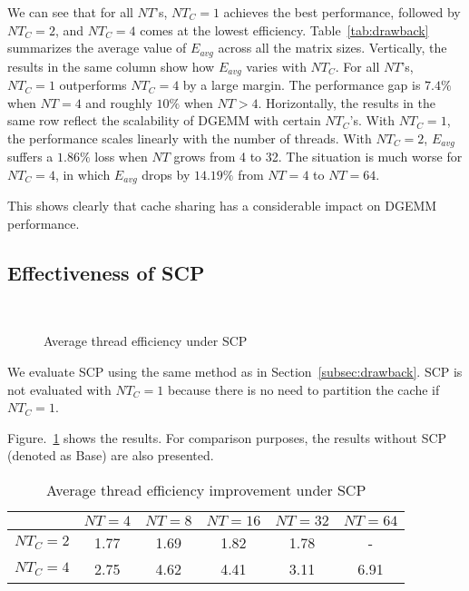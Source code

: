 We can see that for all $NT$'s, $NT_C=1$ achieves the 
best performance, followed by 
$NT_C=2$, and $NT_C=4$ comes at the lowest efficiency.
Table~\ref{tab:drawback} summarizes the average value
of $E_{avg}$ across all the matrix sizes.
Vertically, the results in the same column show how $E_{avg}$ varies with $NT_C$.
For all $NT$'s, $NT_C=1$ outperforms $NT_C=4$ by a large margin.
The performance gap is $7.4\%$ when $NT=4$ and roughly $10\%$ when $NT>4$.
Horizontally,  the results in the same row reflect the scalability of
DGEMM with certain $NT_C$'s.
With $NT_C=1$, the performance scales linearly with the number of threads.
With $NT_C=2$, $E_{avg}$ suffers a $1.86\%$ loss when $NT$ grows from 4 to 32.
The situation is much worse for $NT_C=4$, in which
$E_{avg}$ drops by $14.19\%$ from
$NT=4$ to $NT=64$.

This shows clearly that cache sharing has a considerable
impact on DGEMM performance. 

\subsection{Effectiveness of SCP}\label{subsec:benefit}

\begin{figure}
  \centering
  \\
  \caption{Average thread efficiency under SCP}
  \label{fig:benefit}
\end{figure}

We evaluate SCP using the same method as in Section~\ref{subsec:drawback}.
SCP is not evaluated with $NT_C=1$ because there is no need
to partition the cache if $NT_C=1$.

Figure.~\ref{fig:benefit} shows the results.
For comparison purposes, the results without SCP
(denoted as Base) are also presented.

\begin{table}
  \centering
  \caption{Average thread efficiency improvement under SCP}
  \label{tab:win}
  \setlength{\tabcolsep}{3.5pt}
  \begin{tabular}{cccccc}
    \toprule
     & $NT=4$ & $NT=8$ & $NT=16$ & $NT=32$ & $NT=64$ \\
    \midrule
    $NT_C=2$ & 1.77 & 1.69 & 1.82 & 1.78 & - \\
    $NT_C=4$ & 2.75 & 4.62 & 4.41 & 3.11 & 6.91 \\
    \bottomrule
  \end{tabular}
\end{table}


